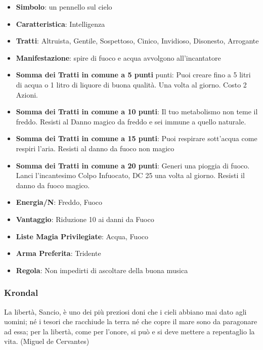 \begin{multicols}{2}
\begin{itemize}[leftmargin=*] \setlength{\itemsep}{0pt}
\item \textbf{Simbolo}: un pennello sul cielo
\item \textbf{Caratteristica}: Intelligenza
\item \textbf{Tratti}: Altruista, Gentile, Sospettoso, Cinico, Invidioso, Disonesto, Arrogante
\item \textbf{Manifestazione}: spire di fuoco e acqua avvolgono all'incantatore
\item \textbf{Somma dei Tratti in comune a 5 punti} punti: Puoi creare fino a 5 litri di acqua o 1 litro di liquore di buona qualità. Una volta al giorno. Costo 2 Azioni.
\item \textbf{Somma dei Tratti in comune a 10 punti}: Il tuo metabolismo non teme il freddo. Resisti al Danno magico da freddo e sei immune a quello naturale.
\item \textbf{Somma dei Tratti in comune a 15 punti}: Puoi respirare sott'acqua come respiri l'aria. Resisti al danno da fuoco non magico
\item \textbf{Somma dei Tratti in comune a 20 punti}: Generi una pioggia di fuoco. Lanci l'incantesimo Colpo Infuocato, DC 25 una volta al giorno. Resisti il danno da fuoco magico.
\item \textbf{Energia/N}: Freddo, Fuoco
\item \textbf{Vantaggio}: Riduzione 10 ai danni da Fuoco
\item \textbf{Liste Magia Privilegiate}: Acqua, Fuoco
\item \textbf{Arma Preferita}: Tridente
\item \textbf{Regola}: Non impedirti di ascoltare della buona musica
\end{itemize}

\subsubsection{Krondal}\label{krondal}\hypertarget{krondal}{}


\begin{changemargin}{0.3cm}{0.3cm}\begin{enfasi}{
La libertà, Sancio, è uno dei più preziosi doni che i cieli abbiano mai dato agli uomini; né i tesori che racchiude la terra né che copre il mare sono da paragonare ad essa; per la libertà, come per l'onore, si può e si deve mettere a repentaglio la vita. (Miguel de Cervantes)
}\end{enfasi}\end{changemargin}\medskip


\end{multicols}
